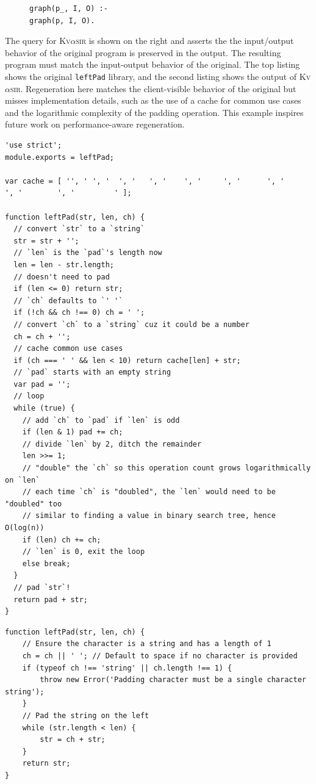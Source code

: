\documentclass[nonacm,sigplan,review]{acmart}
\newcommand{\sys}{{\scshape Kv{$\alpha$}sir}\xspace}
\newcommand{\ttt}[1]{\texttt{#1}\xspace}
\begin{document}
\begin{figure}
\begin{verbatim}
graph(p_, I, O) :-
graph(p, I, O).
\end{verbatim}
\end{figure}
The query for \sys is shown on the right and asserts the the input/output behavior of the
original program is preserved in the output.
The resulting program must match the input-output behavior of the original.
The top listing shows the original \ttt{leftPad} library, and the second listing shows the output
of \sys.
Regeneration here matches the client-visible behavior of the original but misses
implementation details, such as the use of a cache for common
use cases and the logarithmic complexity of the padding operation.
This example inspires future work on performance-aware regeneration.

\begin{listing}[htpb]
\begin{verbatim}
'use strict';
module.exports = leftPad;

var cache = [ '', ' ', '  ', '   ', '    ', '     ', '      ', '       ', '        ', '         ' ];

function leftPad(str, len, ch) {
  // convert `str` to a `string`
  str = str + '';
  // `len` is the `pad`'s length now
  len = len - str.length;
  // doesn't need to pad
  if (len <= 0) return str;
  // `ch` defaults to `' '`
  if (!ch && ch !== 0) ch = ' ';
  // convert `ch` to a `string` cuz it could be a number
  ch = ch + '';
  // cache common use cases
  if (ch === ' ' && len < 10) return cache[len] + str;
  // `pad` starts with an empty string
  var pad = '';
  // loop
  while (true) {
    // add `ch` to `pad` if `len` is odd
    if (len & 1) pad += ch;
    // divide `len` by 2, ditch the remainder
    len >>= 1;
    // "double" the `ch` so this operation count grows logarithmically on `len`
    // each time `ch` is "doubled", the `len` would need to be "doubled" too
    // similar to finding a value in binary search tree, hence O(log(n))
    if (len) ch += ch;
    // `len` is 0, exit the loop
    else break;
  }
  // pad `str`!
  return pad + str;
}
  \end{verbatim}
\caption{The original \ttt{leftPad} library.}
\end{listing}

\begin{listing}[htpb]
  \begin{verbatim}
function leftPad(str, len, ch) {
    // Ensure the character is a string and has a length of 1
    ch = ch || ' '; // Default to space if no character is provided
    if (typeof ch !== 'string' || ch.length !== 1) {
        throw new Error('Padding character must be a single character string');
    }
    // Pad the string on the left
    while (str.length < len) {
        str = ch + str;
    }
    return str;
}
  \end{verbatim}
  \caption{The output of \sys, having regenerated \ttt{leftPad}.}
\end{listing}
\end{document}
